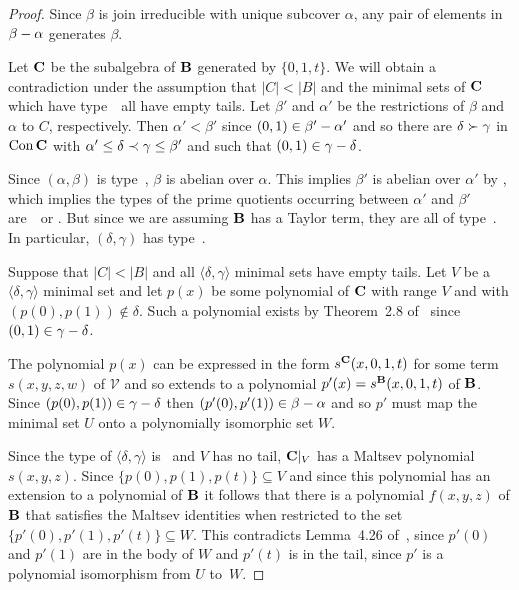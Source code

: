 \begin{proof}
Since $\beta$ is join irreducible with unique subcover $\alpha$, any
pair of elements in $\beta - \alpha$ generates $\beta$.

Let $\mathbf{C}$ be the subalgebra of $\mathbf{B}$ generated by $\{0,1,t\}$. We
will obtain a contradiction under the assumption that $|C| < |B|$
and the minimal sets of $\mathbf{C}$ which have type~\atyp\ all 
have empty tails. Let $\beta'$
and $\alpha'$ be the restrictions of $\beta$ and $\alpha $ to $C$,
respectively. Then $\alpha' < \beta'$ since $(0,1) \in
\beta'- \alpha'$ and so there are $\delta \succ \gamma$ in
$\operatorname{Con}{\mathbf{C}}$ with $\alpha' \le \delta \prec \gamma \le \beta'$ and
such that $(0,1) \in \gamma- \delta$.

Since $(\alpha,\beta)$ is type~\atyp, $\beta$ is abelian over $\alpha$.
This implies $\beta'$ is abelian over $\alpha'$ 
by \cite[Lemma 2.19(9)]{MR3076179},
which implies the
types of the prime quotients occurring between $\alpha'$ and $\beta'$
are~\utyp\ or \atyp.
But since we are assuming $\mathbf{B}$ has a Taylor term,
they are all of type~\atyp. 
In particular, $(\delta,\gamma)$ has type~\atyp.

Suppose that $|C| < |B|$ and all $\langle \delta, \gamma \rangle$
minimal sets have empty tails. Let $V$ be a $\langle \delta,\gamma
\rangle$ minimal set and let $p(x)$ be some polynomial of $\mathbf{C}$
with range $V$ and with $(p(0) ,p(1))\notin \delta$. Such a
polynomial exists by Theorem~2.8 of~\cite{HM:1988}
since $(0,1) \in \gamma- \delta$.

The polynomial $p(x)$ can be expressed in the form 
$s^{\mathbf{C}}(x,0,1,t)$ for some term $s(x,y,z,w)$ 
of $\mathcal V$ and so extends to
a polynomial $p'(x) = s^{\mathbf{B}}(x,0,1,t)$ of $\mathbf{B}$.  Since $(p(0),
p(1)) \in \gamma- \delta$ then $(p'(0), p'(1)) \in
\beta- \alpha$ and so $p'$ must map the minimal set $U$ onto
a polynomially isomorphic set $W$.   

Since the type of $\langle \delta, \gamma \rangle$ is \atyp\ 
and $V$ has no tail,   
$\mathbf{C}|_V$ has a Maltsev polynomial $s(x,y,z)$. 
Since $\{p(0), p(1),p(t)\} \subseteq V$ and 
since this polynomial has an extension to a
polynomial of $\mathbf{B}$ it follows that there is a polynomial
$f(x,y,z)$ of $\mathbf{B}$ that satisfies the Maltsev identities when
restricted to the set $\{p'(0), p'(1), p'(t)\} \subseteq W$. This
contradicts Lemma~4.26 of~\cite{HM:1988}, since $p'(0)$ and $p'(1)$
are in the body of $W$ and $p'(t)$ is in the tail, since $p'$ is a
polynomial isomorphism from $U$ to~$W$.
\end{proof}


